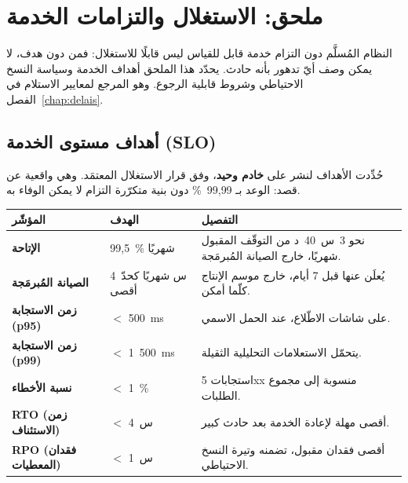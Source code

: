 
\chapter{ملحق: الاستغلال والتزامات الخدمة}
\label{chap:exploitation}
النظام المُسلَّم دون التزام خدمة قابل للقياس ليس قابلًا للاستغلال: فمن دون هدف،
لا يمكن وصف أيّ تدهور بأنه حادث. يحدّد هذا الملحق أهداف الخدمة وسياسة النسخ
الاحتياطي وشروط قابلية الرجوع. وهو المرجع لمعايير الاستلام في
الفصل~\ref{chap:delais}.

\section{أهداف مستوى الخدمة (SLO)}
حُدِّدت الأهداف لنشر على \textbf{خادم وحيد}، وفق قرار الاستغلال المعتمَد. وهي
واقعية عن قصد: الوعد بـ 99{,}99~\% دون بنية متكرّرة التزام لا يمكن الوفاء به.

\begin{xltabular}{\textwidth}{>{\bfseries}p{4.2cm} p{3.4cm} X}
\toprule
\textbf{المؤشّر} & \textbf{الهدف} & \textbf{التفصيل} \\
\midrule
\endhead
الإتاحة & 99{,}5~\% شهريًا & نحو 3~س~40~د من التوقّف المقبول شهريًا، خارج الصيانة المُبرمَجة. \\
\addlinespace
الصيانة المُبرمَجة & 4~س شهريًا كحدّ أقصى & يُعلَن عنها قبل 7 أيام، خارج موسم الإنتاج كلّما أمكن. \\
\addlinespace
زمن الاستجابة (p95) & $<$ 500~ms & على شاشات الاطّلاع، عند الحمل الاسمي. \\
\addlinespace
زمن الاستجابة (p99) & $<$ 1~500~ms & يتحمّل الاستعلامات التحليلية الثقيلة. \\
\addlinespace
نسبة الأخطاء & $<$ 1~\% & استجابات 5xx منسوبة إلى مجموع الطلبات. \\
\addlinespace
\textbf{RTO} (زمن الاستئناف) & $<$ 4~س & أقصى مهلة لإعادة الخدمة بعد حادث كبير. \\
\addlinespace
\textbf{RPO} (فقدان المعطيات) & $<$ 1~س & أقصى فقدان مقبول، تضمنه وتيرة النسخ الاحتياطي. \\
\bottomrule
\end{xltabular}

